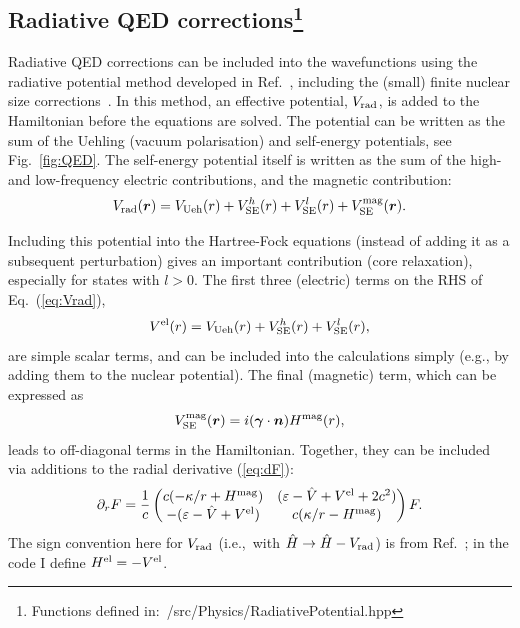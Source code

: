 \documentclass[10pt,twocolumn,a4paper]{article}%
\newcommand{\matr}[4]{\ensuremath{\begin{pmatrix}#1&#2\\#3&#4\end{pmatrix}}}	%
\renewcommand{\v}[1]{\ensuremath{\boldsymbol{#1}}}		%
\newcommand{\be}{\begin{equation}}
\newcommand{\ee}{\end{equation}}
\def\en{\ensuremath{\varepsilon}}
\def\p{\ensuremath{\partial}}
\renewcommand{\k}{\ensuremath{\kappa}}
\begin{document}










\subsection[Radiative QED corrections]{Radiative QED corrections\footnote{Functions defined in:~/src/Physics/RadiativePotential.hpp}}

Radiative QED corrections can be included into the wavefunctions using the radiative potential method developed in Ref.~\cite{FlambaumQED2005}, including the (small) finite nuclear size corrections~\cite{GingesQED2015,Ginges2016}.
In this method, an effective potential, $V_{\rm rad}$,
is added to the Hamiltonian before the equations are solved.
The potential can be written as the sum of the Uehling (vacuum polarisation) and self-energy potentials, see Fig.~\ref{fig:QED}.
The self-energy potential itself is written as the sum of the high- and low-frequency electric contributions, and the magnetic contribution:
\be\label{eq:Vrad}
V_{\rm rad}(\v{r}) = V_{\rm Ueh}(r) + V_{\rm SE}^{h}(r) +  V_{\rm SE}^{l}(r) + V_{\rm SE}^{\rm mag}(\v{r}).
\ee








Including this potential into the Hartree-Fock equations (instead of adding it as a subsequent perturbation) gives an important contribution (core relaxation), especially for states with $l>0$.
The first three (electric) terms on the RHS of Eq.~(\ref{eq:Vrad}),
\be
V^{\rm el}(r) =  V_{\rm Ueh}(r) +V_{\rm SE}^{h}(r) + V_{\rm SE}^{l}(r) ,
\ee
are simple scalar terms, and can be included into the calculations simply (e.g., by adding them to the nuclear potential).
The final (magnetic) term, which can be expressed as~\cite{Ginges2016}
\be
V_{\rm SE}^{\rm mag}(\v{r}) = i (\v{\gamma}\cdot\v{n}) H^{\rm mag}(r),
\ee
leads to off-diagonal terms in the Hamiltonian.
Together, they can be included via additions to the radial derivative (\ref{eq:dF}):
\be\label{eq:dF-Hmag}
\p_r F  =\frac{1}{c} \matr 	{c(-{\k}/{r} + H^{\rm mag})} 	{(\en - \hat V + V^{\rm el} + 2c^2)}  {-(\en - \hat V+ V^{\rm el} )} 	 {c({\k}/{r} - H^{\rm mag})}F.
\ee
The sign convention here for $V_{\rm rad}$ (i.e.,\ with $\hat H \to \hat H -V_{\rm rad}$) is from Ref.~\cite{FlambaumQED2005}; in the code I define $H^{\rm el}=-V^{\rm el}$.
%
\end{document}
